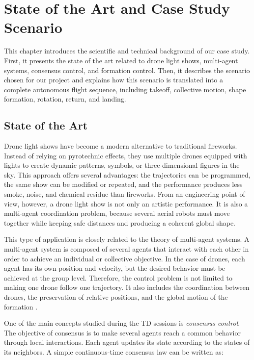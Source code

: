 \chapter{State of the Art and Case Study Scenario}
\label{ch:etat_scenario}

This chapter introduces the scientific and technical background of our case study. First, it presents the state of the art related to drone light shows, multi-agent systems, consensus control, and formation control. Then, it describes the scenario chosen for our project and explains how this scenario is translated into a complete autonomous flight sequence, including takeoff, collective motion, shape formation, rotation, return, and landing.

\section{State of the Art}

Drone light shows have become a modern alternative to traditional fireworks. Instead of relying on pyrotechnic effects, they use multiple drones equipped with lights to create dynamic patterns, symbols, or three-dimensional figures in the sky. This approach offers several advantages: the trajectories can be programmed, the same show can be modified or repeated, and the performance produces less smoke, noise, and chemical residue than fireworks. From an engineering point of view, however, a drone light show is not only an artistic performance. It is also a multi-agent coordination problem, because several aerial robots must move together while keeping safe distances and producing a coherent global shape.

This type of application is closely related to the theory of multi-agent systems. A multi-agent system is composed of several agents that interact with each other in order to achieve an individual or collective objective. In the case of drones, each agent has its own position and velocity, but the desired behavior must be achieved at the group level. Therefore, the control problem is not limited to making one drone follow one trajectory. It also includes the coordination between drones, the preservation of relative positions, and the global motion of the formation \cite{olfati2007consensus}.

One of the main concepts studied during the TD sessions is \textit{consensus control}. The objective of consensus is to make several agents reach a common behavior through local interactions. Each agent updates its state according to the states of its neighbors. A simple continuous-time consensus law can be written as:

